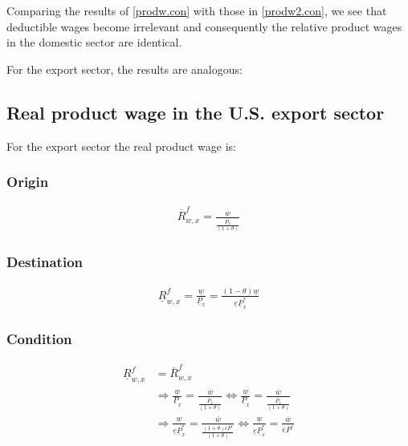 Comparing the results of \eqref{prodw.con} with those in \eqref{prodw2.con}, we see that deductible wages become irrelevant and consequently the relative product wages in the domestic sector are identical.

For the export sector, the results are analogous:
\subsection*{Real product wage in the U.S. export sector}
For the export sector the real product wage is:
\subsubsection*{Origin}
\begin{equation}\label{proxw2.o}
\begin{aligned}
\overline R^f_{w, x} = \frac{\overline w}{\frac{\overline P_x}{ \left( 1+\theta \right) }}\end{aligned}  \end{equation}

\subsubsection*{Destination}
\begin{equation}\label{proxw2.d} 
\begin{aligned}
\underline R^f_{w, x} = \frac{\underline w}{\underline P_x} = \frac{ \left( 1-\theta \right) \underline w}{\underline e \underline P^*_x}\end{aligned}  \end{equation}


\subsubsection*{Condition}
\begin{equation}\label{proxw2.con}
\begin{aligned}
    \underline R^f_{w, x} &= \overline R^f_{w, x} \\ &\Rightarrow \frac{\underline w}{\underline P_x} = \frac{\overline w}{\frac{\overline P_x}{ \left( 1+\theta \right) }} \Leftrightarrow \frac{\underline w}{\underline P_x} = \frac{\overline w}{\frac{\overline P_x}{ \left( 1+\theta \right) }} \\ &\Rightarrow \frac{\underline w}{\underline e \underline P^*_x} = \frac{\overline w}{\frac{ \left( 1+\theta \right) \overline e \overline P^_x}{ \left( 1+\theta \right) }} \Leftrightarrow  \frac{\underline w}{\underline e \underline P^*_x} = \frac{\overline w}{\overline e \overline P^_x} 
\end{aligned}  
\end{equation}

